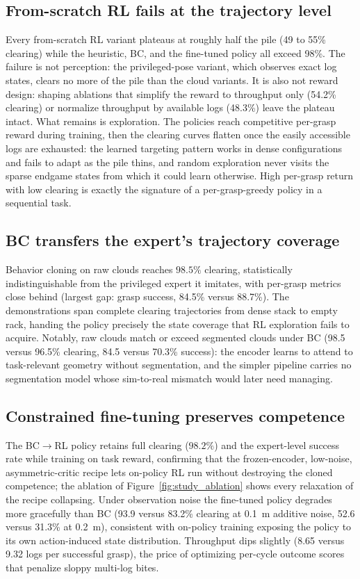 \subsection{From-scratch RL fails at the trajectory level}

Every from-scratch RL variant plateaus at roughly half the pile (49 to 55\%
clearing) while the heuristic, BC, and the fine-tuned policy all exceed 98\%.
The failure is not perception: the privileged-pose variant, which observes
exact log states, clears no more of the pile than the cloud variants. It is
also not reward design: shaping ablations that simplify the reward to
throughput only (54.2\% clearing) or normalize throughput by available logs
(48.3\%) leave the plateau intact. What remains is exploration. The policies
reach competitive per-grasp reward during training, then the clearing curves
flatten once the easily accessible logs are exhausted: the learned targeting
pattern works in dense configurations and fails to adapt as the pile thins,
and random exploration never visits the sparse endgame states from which it
could learn otherwise. High per-grasp return with low clearing is exactly
the signature of a per-grasp-greedy policy in a sequential task.

\subsection{BC transfers the expert's trajectory coverage}

Behavior cloning on raw clouds reaches $98.5\%$ clearing, statistically
indistinguishable from the privileged expert it imitates, with per-grasp
metrics close behind (largest gap: grasp success, 84.5\% versus 88.7\%). The
demonstrations span complete clearing trajectories from dense stack to empty
rack, handing the policy precisely the state coverage that RL exploration
fails to acquire. Notably, raw clouds match or exceed segmented clouds under
BC (98.5 versus 96.5\% clearing, 84.5 versus 70.3\% success): the encoder
learns to attend to task-relevant geometry without segmentation, and the
simpler pipeline carries no segmentation model whose sim-to-real mismatch
would later need managing.

\subsection{Constrained fine-tuning preserves competence}

The BC$\to$RL policy retains full clearing ($98.2\%$) and the expert-level
success rate while training on task reward, confirming that the
frozen-encoder, low-noise, asymmetric-critic recipe lets on-policy RL run
without destroying the cloned competence; the ablation of
Figure~\ref{fig:study_ablation} shows every relaxation of the recipe
collapsing. Under observation noise the fine-tuned policy degrades more
gracefully than BC (93.9 versus 83.2\% clearing at 0.1~m additive noise, 52.6
versus 31.3\% at 0.2~m), consistent with on-policy training exposing the
policy to its own action-induced state distribution. Throughput dips
slightly (8.65 versus 9.32 logs per successful grasp), the price of
optimizing per-cycle outcome scores that penalize sloppy multi-log bites.

